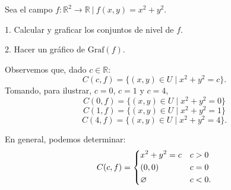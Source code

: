 \begin{example}\label{example:ex1graf}   Sea  el campo  $f: \mathbb{R}^{2} \rightarrow \mathbb{R} \:|\:  f(x,y)=x^2+y^2.$

    1. Calcular y graficar los conjuntos de nivel de $f$.
    
    2. Hacer un gr\'afico de  $\text{Graf}(f)$.
    
    
    
    Observemos que, dado $c \in \mathbb{R}$: 
     $$C(c,f)=\{(x,y) \in U \;|\;   x^2+y^2  =c \}.$$
    Tomando, para ilustrar,  $c=0$, $c=1$ y $c=4$, 
     \[
    C(0,f)=\{(x,y) \in U \;|\; x^2+y^2=0 \}
    \]
     \[
    C(1,f)=\{(x,y) \in U \;|\; x^2+y^2=1 \}
    \]
     \[
    C(4,f)=\{(x,y) \in U \;|\; x^2+y^2=4 \}.
     \]
    
    
\begin{center}
\end{center}
    
    En general, podemos determinar: 
       \[
            C(c,f)=
            \begin{dcases}
               x^2+y^2=c  &  c>0 \\
    (0,0)  & c=0\\
    \varnothing  & c<0.\\
            \end{dcases}
        \]


\end{example}
